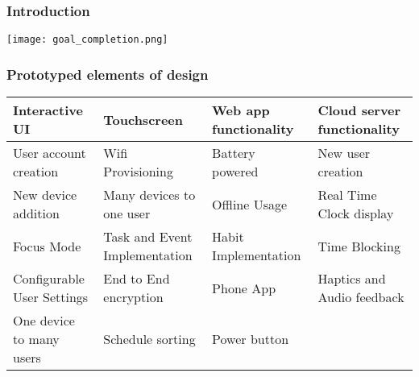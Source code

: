 \documentclass{beamer}
\begin{document}
\frame{\titlepage}

\begin{frame}
  \frametitle{Introduction}
  \begin{quote}{}
    
  \end{quote}

  \texttt{[image: goal\_completion.png]}

\end{frame}

\begin{frame}
  \frametitle{Prototyped elements of design}
\centering
\small
\begin{tabular}{|p{}|p{}|p{}|p{}|}
\hline
\cellcolor[HTML]{CFE2F3}Interactive UI        & Touchscreen                                           & \cellcolor[HTML]{CFE2F3}Web app functionality & \cellcolor[HTML]{CFE2F3}Cloud server functionality \\ \hline
\cellcolor[HTML]{CFE2F3}User account creation & \cellcolor[HTML]{CFE2F3}Wifi Provisioning             & Battery powered                               & \cellcolor[HTML]{CFE2F3}New user creation          \\ \hline
\cellcolor[HTML]{CFE2F3}New device addition                           & \cellcolor[HTML]{CFE2F3}Many devices to one user      & \cellcolor[HTML]{CFE2F3}Offline Usage         & \cellcolor[HTML]{CFE2F3}Real Time Clock display    \\ \hline
\cellcolor[HTML]{CFE2F3}Focus Mode            & \cellcolor[HTML]{CFE2F3}Task and Event Implementation & \cellcolor[HTML]{CFE2F3}Habit Implementation  & Time Blocking                                      \\ \hline
Configurable User Settings                    & End to End encryption                                 & Phone App                                     & Haptics and Audio feedback                         \\ \hline
One device to many users                      & Schedule sorting                                      & Power button                                  &                                                    \\ \hline
\end{tabular}
\end{frame}
\end{document}
